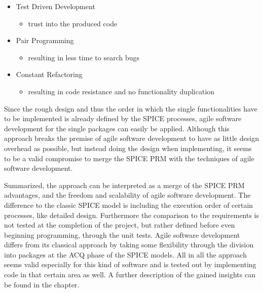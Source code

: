 \begin{itemize}
 \item Test Driven Development
 \begin{itemize}
  \item trust into the produced code
 \end{itemize}

 \item Pair Programming
 \begin{itemize}
  \item resulting in less time to search bugs
 \end{itemize}
 
 \item Constant Refactoring
 \begin{itemize}
  \item resulting in code resistance and no functionality duplication
 \end{itemize}
\end{itemize}

Since the rough design and thus the order in which the single functionalities have to be implemented is already defined by the SPICE processes,
agile software development for the single packages can easily be applied. Although this approach breaks the premise of agile software 
development to have as little design overhead as possible, but instead doing the design when implementing, it seems to be a valid compromise to 
merge the SPICE PRM with the techniques of agile software development. 

Summarized, the approach can be interpreted as a merge of the SPICE PRM advantages, and the freedom 
and scalability of agile software development. The difference to the classic SPICE model is including the execution order of certain processes, 
like detailed design. Furthermore the comparison to the requirements is not tested at the completion of the project, but rather defined before 
even beginning programming, through the unit tests. Agile software development differs from its classical approach by taking some flexibility 
through the division into packages at the ACQ phase of the SPICE models. All in all the approach seems valid especially for this kind of 
software and is tested out by implementing code in that certain area as well. A further description of the gained insights can be found in the 
 chapter.

